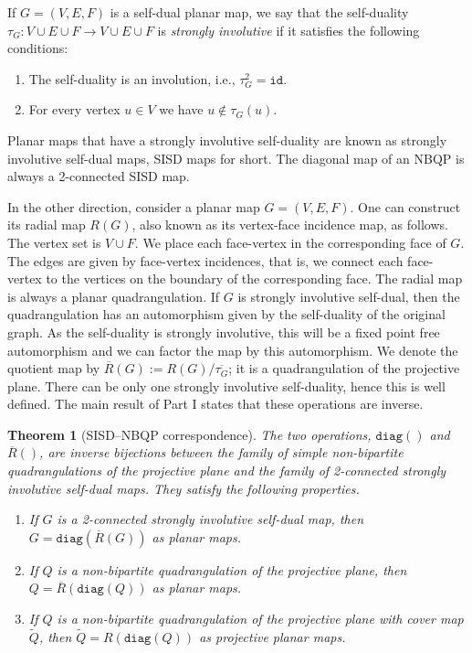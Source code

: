 \documentclass[10pt,a4paper]{article}
\newtheorem{theorem}{Theorem}[section]
\newcommand{\diag}[0]{\mathtt{diag}}
\newcommand{\id}{\mathtt{id}}
\begin{document}
If $G=(V,E,F)$ is a self-dual planar map, we say that the  self-duality  $\tau_G:V\cup E\cup F \rightarrow V\cup E\cup F$ is \emph{strongly involutive} if it satisfies the following conditions:
\begin{enumerate}
    \item[1)]  The self-duality is an involution, i.e., $\tau_G^2=\id$.
    \item[2)]  For every vertex $u\in V$ we have $u \notin \tau_G(u)$.
\end{enumerate}
Planar maps that have a strongly involutive self-duality are known as strongly involutive self-dual maps, SISD maps for short.
The diagonal map of an NBQP is always a 2-connected SISD map. 

In the other direction, consider a planar map $G=(V,E,F)$. One can construct its radial map $R(G)$, also known as its vertex-face incidence map, as follows. The vertex set is $V\cup F$. We place each face-vertex in the corresponding face of $G$. The edges are given by face-vertex incidences, that is, we connect each face-vertex to the vertices on the boundary of the corresponding face. The radial map is always a planar quadrangulation. If $G$ is strongly involutive self-dual, then the quadrangulation  has an automorphism given by the self-duality of the original graph. As the self-duality is strongly involutive, this will be a fixed point free automorphism and we can factor the map by this automorphism. We denote the quotient map by $\overline R(G):=R(G)/\overline{\tau_G}$; it is a quadrangulation of the projective plane. There can be only one strongly involutive self-duality, hence this is well defined. The main result of Part I states that these operations are inverse.


\begin{theorem}[SISD--NBQP correspondence]\label{thm:commute} The two operations, $\diag()$ and $\overline R()$, are inverse bijections between the family of simple non-bipartite quadrangulations of the projective plane  and the family of 2-connected strongly involutive self-dual maps. They satisfy the following properties.  
\begin{enumerate}
    \item[a)] If $G$ is a 2-connected strongly involutive self-dual map, then $G=\diag(\overline R(G))$ as planar maps.
    \item[b)] If $Q$ is a non-bipartite quadrangulation of the projective plane, then $Q=\overline R(\diag(Q))$ as planar maps.
    \item[c)] If $Q$ is a non-bipartite quadrangulation of the projective plane with cover map $\widetilde Q$, then $\widetilde Q= R(\diag(Q))$ as projective planar maps.

\end{enumerate}
    \end{theorem}
\end{document}
